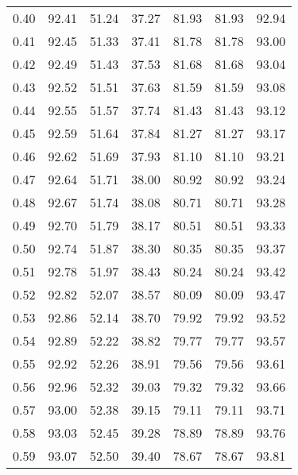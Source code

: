 \begin{tabular}{|c|c|c|c|c|c|c|}
      0.40 &     92.41 &     51.24 &      37.27 &   81.93 &      81.93 &         92.94 \\
      0.41 &     92.45 &     51.33 &      37.41 &   81.78 &      81.78 &         93.00 \\
      0.42 &     92.49 &     51.43 &      37.53 &   81.68 &      81.68 &         93.04 \\
      0.43 &     92.52 &     51.51 &      37.63 &   81.59 &      81.59 &         93.08 \\
      0.44 &     92.55 &     51.57 &      37.74 &   81.43 &      81.43 &         93.12 \\
      0.45 &     92.59 &     51.64 &      37.84 &   81.27 &      81.27 &         93.17 \\
      0.46 &     92.62 &     51.69 &      37.93 &   81.10 &      81.10 &         93.21 \\
      0.47 &     92.64 &     51.71 &      38.00 &   80.92 &      80.92 &         93.24 \\
      0.48 &     92.67 &     51.74 &      38.08 &   80.71 &      80.71 &         93.28 \\
      0.49 &     92.70 &     51.79 &      38.17 &   80.51 &      80.51 &         93.33 \\
      0.50 &     92.74 &     51.87 &      38.30 &   80.35 &      80.35 &         93.37 \\
      0.51 &     92.78 &     51.97 &      38.43 &   80.24 &      80.24 &         93.42 \\
      0.52 &     92.82 &     52.07 &      38.57 &   80.09 &      80.09 &         93.47 \\
      0.53 &     92.86 &     52.14 &      38.70 &   79.92 &      79.92 &         93.52 \\
      0.54 &     92.89 &     52.22 &      38.82 &   79.77 &      79.77 &         93.57 \\
      0.55 &     92.92 &     52.26 &      38.91 &   79.56 &      79.56 &         93.61 \\
      0.56 &     92.96 &     52.32 &      39.03 &   79.32 &      79.32 &         93.66 \\
      0.57 &     93.00 &     52.38 &      39.15 &   79.11 &      79.11 &         93.71 \\
      0.58 &     93.03 &     52.45 &      39.28 &   78.89 &      78.89 &         93.76 \\
      0.59 &     93.07 &     52.50 &      39.40 &   78.67 &      78.67 &         93.81 \\

\end{tabular}
